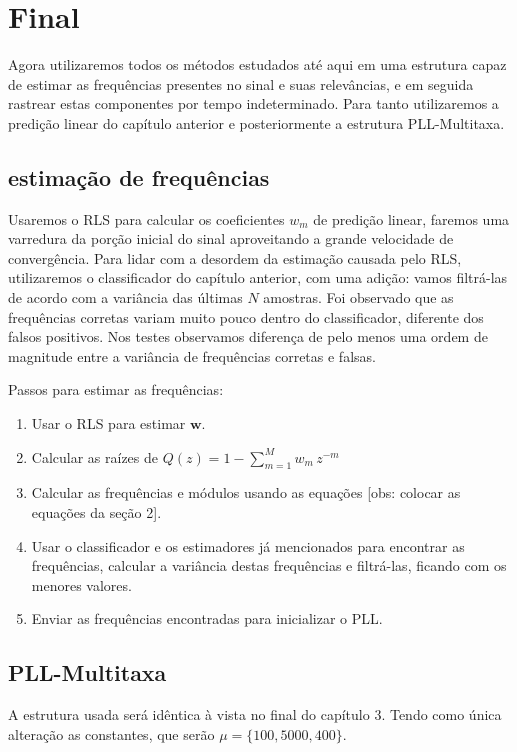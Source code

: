 
\section{Final}

Agora utilizaremos todos os métodos estudados até aqui em uma estrutura capaz de estimar as frequências presentes no sinal e suas relevâncias, e em seguida rastrear estas componentes por tempo indeterminado. Para tanto utilizaremos a predição linear do capítulo anterior e posteriormente a estrutura PLL-Multitaxa. 

\subsection{estimação de frequências}

Usaremos o RLS para calcular os coeficientes $w_m$ de predição linear, faremos uma varredura da porção inicial do sinal aproveitando a grande velocidade de convergência. Para lidar com a desordem da estimação causada pelo RLS, utilizaremos o classificador do capítulo anterior, com uma adição: vamos filtrá-las de acordo com a variância das últimas $N$ amostras. Foi observado que as frequências corretas variam muito pouco dentro do classificador, diferente dos falsos positivos. Nos testes observamos diferença de pelo menos uma ordem de magnitude entre a variância de frequências corretas e falsas.

Passos para estimar as frequências:

\begin{enumerate}
	\item Usar o RLS para estimar $\boldsymbol{w}$.
	\item Calcular as raízes de $Q(z)=1-\sum_{m=1}^{M}w_m \, z^{-m}$
	\item Calcular as frequências e módulos usando as equações [obs: colocar as equações da seção 2].
	\item Usar o classificador e os estimadores já mencionados para encontrar as frequências, calcular a variância destas frequências e filtrá-las, ficando com os menores valores.
	\item Enviar as frequências encontradas para inicializar o PLL.  
\end{enumerate}
	
\subsection{PLL-Multitaxa}
A estrutura usada será idêntica à vista no final do capítulo 3. Tendo como única alteração as constantes, que serão $\mu=\{100, 5000, 400\}$.

